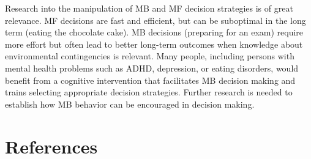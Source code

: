 \documentclass[11pt]{article} %
\begin{document}
Research into the manipulation of MB and MF decision strategies is of great relevance. MF decisions are fast and efficient, but can be suboptimal in the long term (eating the chocolate cake). MB decisions (preparing for an exam) require more effort but often lead to better long-term outcomes when knowledge about environmental contingencies is relevant. Many people, including persons with mental health problems such as ADHD, depression, or eating disorders, would benefit from a cognitive intervention that facilitates MB decision making and trains selecting appropriate decision strategies. Further research is needed to establish how MB behavior can be encouraged in decision making.

\section{References}

\printbibliography
\end{document}
